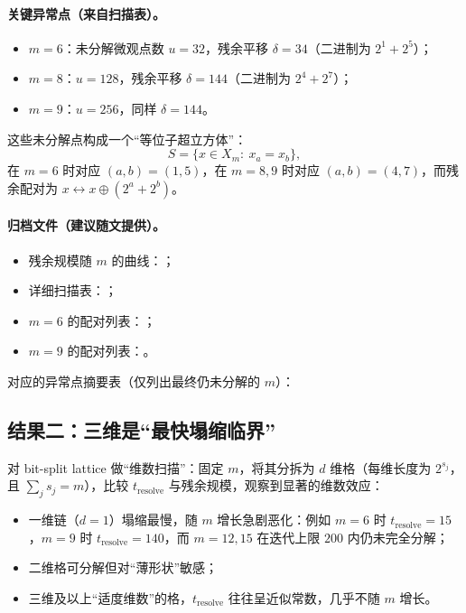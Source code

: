 \paragraph{关键异常点（来自扫描表）。}
\begin{itemize}
  \item $m=6$：未分解微观点数 $u=32$，残余平移 $\delta=34$（二进制为 $2^1+2^5$）；
  \item $m=8$：$u=128$，残余平移 $\delta=144$（二进制为 $2^4+2^7$）；
  \item $m=9$：$u=256$，同样 $\delta=144$。
\end{itemize}
这些未分解点构成一个“等位子超立方体”：
\[
S=\{x\in X_m:\ x_a=x_b\},
\]
在 $m=6$ 时对应 $(a,b)=(1,5)$，在 $m=8,9$ 时对应 $(a,b)=(4,7)$，而残余配对为
$x\leftrightarrow x\oplus(2^a+2^b)$。

\paragraph{归档文件（建议随文提供）。}
\begin{itemize}
  \item 残余规模随 $m$ 的曲线：；
  \item 详细扫描表：；
  \item $m=6$ 的配对列表：；
  \item $m=9$ 的配对列表：。
\end{itemize}


\begin{sloppypar}
\noindent
对应的异常点摘要表（仅列出最终仍未分解的 $m$）：
\end{sloppypar}
\begin{center}

\end{center}

\subsection{结果二：三维是“最快塌缩临界”}

对 bit-split lattice 做“维数扫描”：固定 $m$，将其分拆为 $d$ 维格（每维长度为 $2^{s_j}$，且 $\sum_j s_j=m$），比较 $t_{\mathrm{resolve}}$ 与残余规模，观察到显著的维数效应：
\begin{itemize}
  \item 一维链（$d=1$）塌缩最慢，随 $m$ 增长急剧恶化：例如 $m=6$ 时 $t_{\mathrm{resolve}}=15$，$m=9$ 时 $t_{\mathrm{resolve}}=140$，而 $m=12,15$ 在迭代上限 $200$ 内仍未完全分解；
  \item 二维格可分解但对“薄形状”敏感；
  \item 三维及以上“适度维数”的格，$t_{\mathrm{resolve}}$ 往往呈近似常数，几乎不随 $m$ 增长。
\end{itemize}

